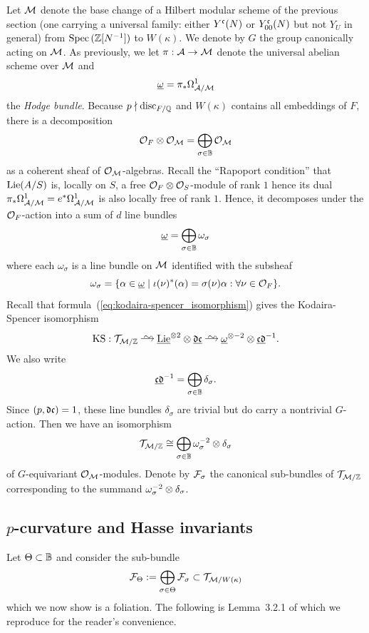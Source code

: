 \documentclass[main.tex]{subfiles}
\begin{document}
\par 
Let $\mathcal{M}$ denote the base change of a Hilbert modular scheme of the previous section (one carrying a universal family: either $Y^{\mathfrak{c}}(N)$ or $Y^{\mathfrak{c}}_{00}(N)$ but not $Y_U$ in general) from $\operatorname{\mathrm{Spec}}{(\mathbb{Z}[N^{-1}])}$ to $W(\kappa)$. We denote by $G$ the group canonically acting on $\mathcal{M}$. As previously, we let $\pi : \mathcal{A} \to \mathcal{M}$ denote the universal abelian scheme over $\mathcal{M}$ and
\[ \underline{\omega} = \pi_* \Omega^1_{\mathcal{A}/\mathcal{M}} \]
the \textit{Hodge bundle}. Because $p \nmid \mathrm{disc}_{F/\mathbb{Q}}$ and $W(\kappa)$ contains all embeddings of $F$, there is a decomposition
\[ \mathcal{O}_F \otimes \mathcal{O}_{\mathcal{M}} = \bigoplus_{\sigma \in \mathbb{B}} \mathcal{O}_{\mathcal{M}} \]
as a coherent sheaf of $\mathcal{O}_{\mathcal{M}}$-algebras. Recall the ``Rapoport condition'' that $\mathrm{Lie}(A/S)$ is, locally on $S$, a free $\mathcal{O}_F \otimes \mathcal{O}_S$-module of rank $1$ hence its dual $\pi_* \Omega^1_{\mathcal{A}/\mathcal{M}} = e^* \Omega^1_{\mathcal{A}/\mathcal{M}}$ is also locally free of rank $1$. Hence, it decomposes under the $\mathcal{O}_F$-action into a sum of $d$ line bundles 
\[ \underline{\omega} = \bigoplus_{\sigma \in \mathbb{B}} \omega_{\sigma} \]
where each $\omega_{\sigma}$ is a line bundle on $\mathcal{M}$ identified with the subsheaf
\[ \omega_{\sigma} = \{ \alpha \in \underline{\omega} \mid \iota(\nu)^*(\alpha) = \sigma(\nu) \alpha : \forall \nu \in \mathcal{O}_F \}. \]
Recall that formula~(\ref{eq:kodaira-spencer_isomorphism}) gives the Kodaira-Spencer isomorphism
\[ \KS : \cT_{\cM / \ZZ} \iso \ul{\Lie}^{\ot 2} \ot \ul{\dd \cc} \iso \ul{\omega}^{\ot -2} \ot \ul{\cc \dd}^{-1}. \]
We also write
\[ \underline{\mathfrak{c} \mathfrak{d}}^{-1} = \bigoplus_{\sigma \in \mathbb{B}} \delta_{\sigma}. \]
Since $(p, \mathfrak{d} \mathfrak{c}) = 1$, these line bundles $\delta_{\sigma}$ are trivial but do carry a nontrivial $G$-action. Then we have an isomorphism
\[ \mathcal{T}_{\mathcal{M} / \mathbb{Z}} \cong \bigoplus_{\sigma \in \mathbb{B}} \omega_\sigma^{-2} \otimes \delta_{\sigma} \]
of $G$-equivariant $\mathcal{O}_{\mathcal{M}}$-modules.
Denote by $\mathcal{F}_\sigma$ the canonical sub-bundles of $\mathcal{T}_{\mathcal{M} / \mathbb{Z}}$ corresponding to the summand $\omega^{-2}_{\sigma} \otimes \delta_{\sigma}$. 

\subsection{$p$-curvature and Hasse invariants}

Let $\Theta \subset \mathbb{B}$ and consider the sub-bundle
\[ \mathcal{F}_{\Theta} := \bigoplus_{\sigma \in \Theta} \mathcal{F}_{\sigma} \subset \mathcal{T}_{\mathcal{M} / W(\kappa)} \]
which we now show is a foliation. The following is Lemma~3.2.1 of \cite{goren_deshalit:foliations_shimura} which we reproduce for the reader's convenience. 
\end{document}
